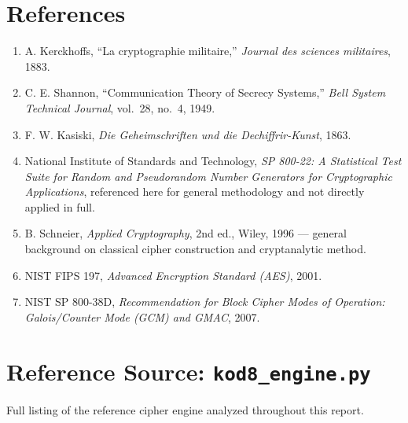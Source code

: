\documentclass[11pt]{article}
\begin{document}
\section*{References}

\begin{enumerate}[leftmargin=1.6em]
\item A. Kerckhoffs, ``La cryptographie militaire,'' \emph{Journal des
sciences militaires}, 1883.
\item C. E. Shannon, ``Communication Theory of Secrecy Systems,''
\emph{Bell System Technical Journal}, vol.\ 28, no.\ 4, 1949.
\item F. W. Kasiski, \emph{Die Geheimschriften und die Dechiffrir-Kunst},
1863.
\item National Institute of Standards and Technology, \emph{SP 800-22:
A Statistical Test Suite for Random and Pseudorandom Number Generators
for Cryptographic Applications}, referenced here for general
methodology and not directly applied in full.
\item B. Schneier, \emph{Applied Cryptography}, 2nd ed., Wiley, 1996 ---
general background on classical cipher construction and cryptanalytic
method.
\item NIST FIPS 197, \emph{Advanced Encryption Standard (AES)}, 2001.
\item NIST SP 800-38D, \emph{Recommendation for Block Cipher Modes of
Operation: Galois/Counter Mode (GCM) and GMAC}, 2007.
\end{enumerate}

\newpage
\appendix

\section{Reference Source: \texttt{kod8\_engine.py}}
\label{app:engine}

Full listing of the reference cipher engine analyzed throughout this
report.
\end{document}
